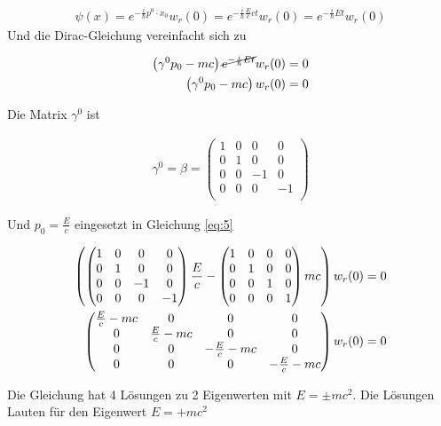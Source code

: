 \begin{align}
  \label{eq:2}
  \psi(x) =  e^{-\frac{i}{\hbar}p^0\cdot x_0}w_r(0) = e^{-\frac{i}{\hbar}\frac{E}{c}ct  }w_r(0) =e^{-\frac{i}{\hbar}Et  }w_r(0)
\end{align}
Und die Dirac-Gleichung vereinfacht sich zu

\begin{align}
  \label{eq:5}
  \left(\gamma^0p_0 - mc\right) \cancel{e^{-\frac{i}{\hbar}Et  }} w_r(0)  &= 0 \notag\\
 \left(\gamma^0p_0 - mc\right) w_r(0)  &= 0 
\end{align}

Die Matrix \(\gamma^0\) ist

\begin{align}
  \label{eq:6}
  \gamma^0 = \beta =
  \begin{pmatrix}
    1&0&0&0\\
    0&1&0&0\\ 
    0&0&-1&0\\
    0&0&0&-1\\
  \end{pmatrix}
\end{align}

Und \(p_0=\frac{E}{c}\) eingesetzt in Gleichung \eqref{eq:5}

\begin{align}
  \label{eq:7}
   \left( 
  \begin{pmatrix}
    1&0&0&0\\
    0&1&0&0\\ 
    0&0&-1&0\\
    0&0&0&-1
  \end{pmatrix}\frac{E}{c} 
-  \begin{pmatrix}
    1&0&0&0\\
    0&1&0&0\\ 
    0&0&1&0\\
    0&0&0&1
  \end{pmatrix}
  mc\right) w_r(0)  &= 0 \notag \\
 \begin{pmatrix}
    \frac{E}{c} - mc&0&0&0\\
    0&\frac{E}{c} - mc&0&0\\ 
    0&0&-\frac{E}{c} - mc&0\\
    0&0&0&-\frac{E}{c} - mc
  \end{pmatrix} w_r(0) &=0
\end{align}

Die Gleichung hat 4 Lösungen zu 2 Eigenwerten mit \(E=\pm mc^2\). Die Lösungen Lauten für den Eigenwert \(E=+mc^2\)

